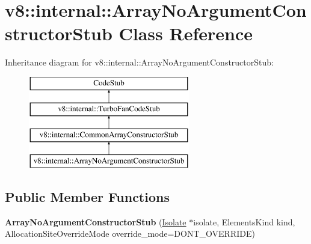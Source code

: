\hypertarget{classv8_1_1internal_1_1_array_no_argument_constructor_stub}{}\section{v8\+:\+:internal\+:\+:Array\+No\+Argument\+Constructor\+Stub Class Reference}
\label{classv8_1_1internal_1_1_array_no_argument_constructor_stub}
Inheritance diagram for v8\+:\+:internal\+:\+:Array\+No\+Argument\+Constructor\+Stub\+:\begin{figure}[H]
\begin{center}
\leavevmode
\includegraphics[height=4.000000cm]{classv8_1_1internal_1_1_array_no_argument_constructor_stub}
\end{center}
\end{figure}
\subsection*{Public Member Functions}
\begin{DoxyCompactItemize}
\item 
{\bfseries Array\+No\+Argument\+Constructor\+Stub} (\hyperlink{classv8_1_1internal_1_1_isolate}{Isolate} $\ast$isolate, Elements\+Kind kind, Allocation\+Site\+Override\+Mode override\+\_\+mode=D\+O\+N\+T\+\_\+\+O\+V\+E\+R\+R\+I\+DE)\hypertarget{classv8_1_1internal_1_1_array_no_argument_constructor_stub_a4b397b510eb1fa18711048d7ffb4b2ca}{}\label{classv8_1_1internal_1_1_array_no_argument_constructor_stub_a4b397b510eb1fa18711048d7ffb4b2ca}

\end{DoxyCompactItemize}
